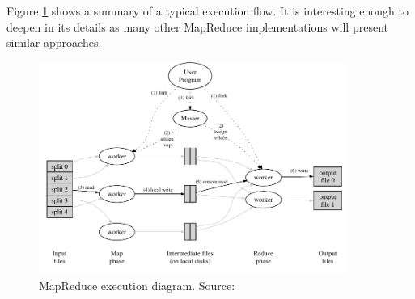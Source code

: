 Figure \ref{fig:exmapreduce} shows a summary of a typical execution flow. It is interesting enough to deepen in its details as many other MapReduce implementations will present similar approaches.

\begin{figure}[tbp]
\begin{center}
 \includegraphics[width=0.9\textwidth]{imagenes/006.pdf}
 \caption{MapReduce execution diagram. Source: \cite{googlemapreduce}}
 \label{fig:exmapreduce}
\end{center}
\end{figure}

